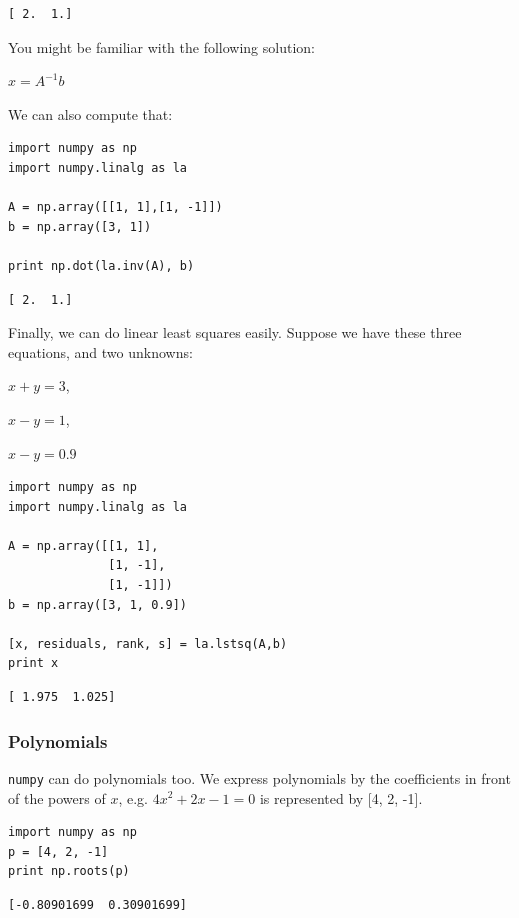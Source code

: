 \documentclass[11pt]{article}
\begin{document}
\begin{verbatim}
[ 2.  1.]
\end{verbatim}

You might be familiar with the following solution:

\(x = A^{-1} b\)

We can also compute that:

\begin{verbatim}
import numpy as np
import numpy.linalg as la

A = np.array([[1, 1],[1, -1]])
b = np.array([3, 1])

print np.dot(la.inv(A), b)
\end{verbatim}

\begin{verbatim}
[ 2.  1.]
\end{verbatim}

Finally, we can do linear least squares easily. Suppose we have these three equations, and two unknowns:

\(x + y = 3\),

\(x - y = 1\),

\(x - y = 0.9\)

\begin{verbatim}
import numpy as np
import numpy.linalg as la

A = np.array([[1, 1],
              [1, -1],
              [1, -1]])
b = np.array([3, 1, 0.9])

[x, residuals, rank, s] = la.lstsq(A,b)
print x
\end{verbatim}

\begin{verbatim}
[ 1.975  1.025]
\end{verbatim}


\subsubsection{Polynomials}
\label{sec:org008c85b}
\texttt{numpy} can do polynomials too. We express polynomials by the coefficients in front of the powers of \(x\), e.g. \(4 x^2 + 2x - 1 = 0\) is represented by [4, 2, -1].

\begin{verbatim}
import numpy as np
p = [4, 2, -1]
print np.roots(p)
\end{verbatim}

\begin{verbatim}
[-0.80901699  0.30901699]
\end{verbatim}
\end{document}
